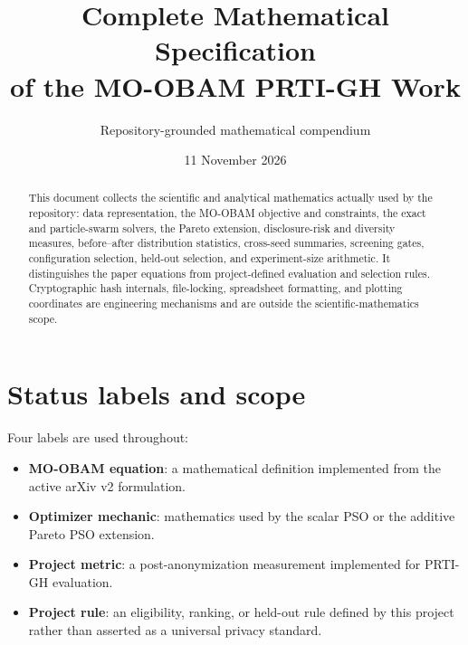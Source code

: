 \documentclass[11pt,a4paper]{article}
\title{Complete Mathematical Specification\\
of the MO-OBAM PRTI-GH Work}
\author{Repository-grounded mathematical compendium}
\date{11 November 2026}
\begin{document}
\maketitle

\begin{abstract}
This document collects the scientific and analytical mathematics actually used
by the repository: data representation, the MO-OBAM objective and constraints,
the exact and particle-swarm solvers, the Pareto extension, disclosure-risk and
diversity measures, before--after distribution statistics, cross-seed summaries,
screening gates, configuration selection, held-out selection, and experiment-size
arithmetic.  It distinguishes the paper equations from project-defined evaluation
and selection rules.  Cryptographic hash internals, file-locking, spreadsheet
formatting, and plotting coordinates are engineering mechanisms and are outside
the scientific-mathematics scope.
\end{abstract}

\tableofcontents
\newpage

\section{Status labels and scope}

Four labels are used throughout:
\begin{itemize}
  \item \textbf{MO-OBAM equation}: a mathematical definition implemented from
  the active arXiv v2 formulation.
  \item \textbf{Optimizer mechanic}: mathematics used by the scalar PSO or the
  additive Pareto PSO extension.
  \item \textbf{Project metric}: a post-anonymization measurement implemented
  for PRTI-GH evaluation.
  \item \textbf{Project rule}: an eligibility, ranking, or held-out rule defined
  by this project rather than asserted as a universal privacy standard.
\end{itemize}
\end{document}
